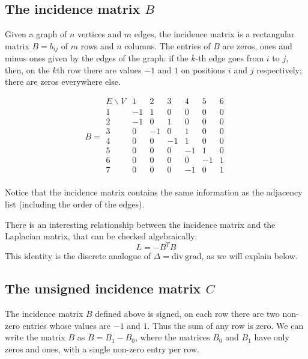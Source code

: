 \subsection{The incidence matrix $B$}


Given a graph of $n$ vertices and $m$ edges,
the incidence matrix is a rectangular matrix $B=b_{ij}$ of $m$ rows and $n$
columns.  The entries of $B$ are zeros, ones and minus ones given by the
edges of the graph: if the $k$-th edge goes from $i$ to $j$, then, on the
$k$th row there are values $-1$ and $1$ on positions $i$ and $j$
respectively; there are zeros everywhere else.

$$
B =
\begin{array}{l|lllllll}
	E\backslash V
	  & 1 & 2 & 3 & 4 & 5 & 6 \\
	\hline
	1 &-1 & 1 & 0 & 0 & 0 & 0 \\
	2 &-1 & 0 & 1 & 0 & 0 & 0 \\
	3 & 0 &-1 & 0 & 1 & 0 & 0 \\
	4 & 0 & 0 &-1 & 1 & 0 & 0 \\
	5 & 0 & 0 & 0 &-1 & 1 & 0 \\
	6 & 0 & 0 & 0 & 0 &-1 & 1 \\
	7 & 0 & 0 & 0 &-1 & 0 & 1 \\
\end{array}
$$



Notice that the incidence matrix contains the same information as the
adjacency list (including the order of the edges).



There is an interesting relationship between the incidence matrix and the
Laplacian matrix, that can be checked algebraically:
\[
L = -B^TB
\]
This identity is the discrete analogue of $\Delta=\mathrm{div\ grad}$,
as we will explain below.



\subsection{The unsigned incidence matrix $C$}


The incidence matrix $B$ defined above is signed, on each row there are two
non-zero entries whose values are $-1$ and $1$.  Thus the sum of any row is
zero.
We can write the matrix $B$ as $B=B_1-B_0$, where the matrices
$B_0$ and $B_1$ have only zeros and ones, with a single non-zero entry per
row.



